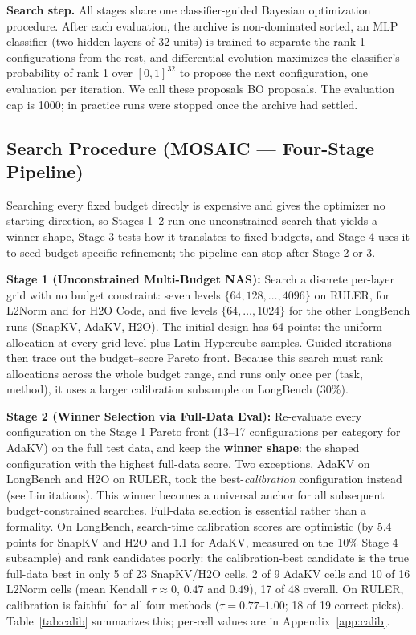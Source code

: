 \documentclass[11pt]{article}
\begin{document}
\textbf{Search step.} All stages share one classifier-guided Bayesian optimization procedure. After each evaluation, the archive is non-dominated sorted, an MLP classifier (two hidden layers of 32 units) is trained to separate the rank-1 configurations from the rest, and differential evolution maximizes the classifier's probability of rank 1 over $[0,1]^{32}$ to propose the next configuration, one evaluation per iteration. We call these proposals BO proposals. The evaluation cap is 1000; in practice runs were stopped once the archive had settled.

\subsection{Search Procedure (MOSAIC — Four-Stage Pipeline)}

Searching every fixed budget directly is expensive and gives the optimizer no starting direction, so Stages 1--2 run one unconstrained search that yields a winner shape, Stage 3 tests how it translates to fixed budgets, and Stage 4 uses it to seed budget-specific refinement; the pipeline can stop after Stage 2 or 3.

\textbf{Stage 1 (Unconstrained Multi-Budget NAS):} Search a discrete per-layer grid with no budget constraint: seven levels $\{64,128,\dots,4096\}$ on RULER, for L2Norm and for H2O Code, and five levels $\{64,\dots,1024\}$ for the other LongBench runs (SnapKV, AdaKV, H2O). The initial design has 64 points: the uniform allocation at every grid level plus Latin Hypercube samples. Guided iterations then trace out the budget--score Pareto front. Because this search must rank allocations across the whole budget range, and runs only once per (task, method), it uses a larger calibration subsample on LongBench (30\%).

\textbf{Stage 2 (Winner Selection via Full-Data Eval):} Re-evaluate every configuration on the Stage 1 Pareto front (13--17 configurations per category for AdaKV) on the full test data, and keep the \textbf{winner shape}: the shaped configuration with the highest full-data score. Two exceptions, AdaKV on LongBench and H2O on RULER, took the best-\emph{calibration} configuration instead (see Limitations). This winner becomes a universal anchor for all subsequent budget-constrained searches. Full-data selection is essential rather than a formality. On LongBench, search-time calibration scores are optimistic (by 5.4 points for SnapKV and H2O and 1.1 for AdaKV, measured on the 10\% Stage 4 subsample) and rank candidates poorly: the calibration-best candidate is the true full-data best in only 5 of 23 SnapKV/H2O cells, 2 of 9 AdaKV cells and 10 of 16 L2Norm cells (mean Kendall $\tau \approx 0$, $0.47$ and $0.49$), 17 of 48 overall. On RULER, calibration is faithful for all four methods ($\tau = 0.77$--$1.00$; 18 of 19 correct picks). Table~\ref{tab:calib} summarizes this; per-cell values are in Appendix~\ref{app:calib}.
\end{document}

